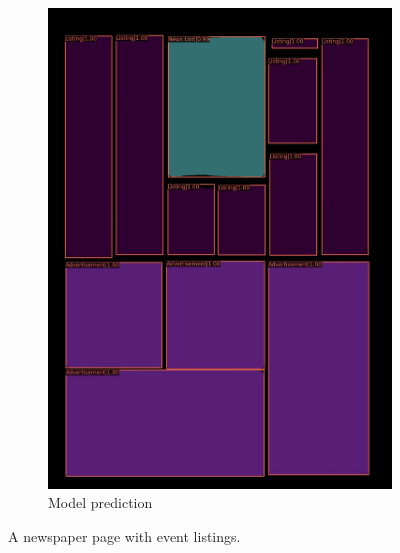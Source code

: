 \documentclass[aspectratio=1610]{beamer}
\begin{document}
\begin{frame}
\begin{figure}
\begin{subfigure}{.25\textwidth}
  \includegraphics[width=0.99\linewidth, clip=true, trim = 0mm 0mm 0mm 0mm]{figures/labels-vanilla-0.75/kvtooQ3.jpg}
  \caption{Model prediction}
\end{subfigure}
\caption{A newspaper page with event listings.}
\label{fig:extendedlabel}
\end{figure}
\end{frame}
\normalpage
\end{document}
